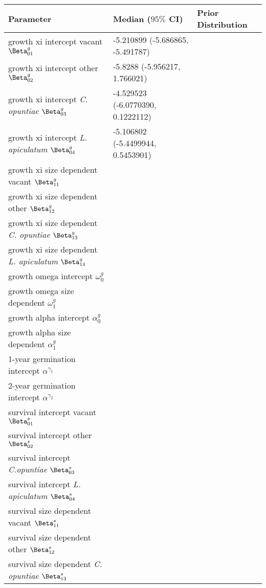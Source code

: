 \documentclass[11pt]{article}
\begin{document}
  \begin{table}[]
  \begin{tabular}{l|l|l}
    \textbf{Parameter} & \textbf{Median ($95\%$ CI)} & \textbf{Prior Distribution} \\
    \hline
    growth xi intercept vacant $\Beta_{01}^g$ & -5.210899 (-5.686865, -5.491787) & \\
    growth xi intercept other $\Beta_{02}^g$ & -5.8288 (-5.956217, 1.766021) & \\
    growth xi intercept \textit{C. opuntiae} $\Beta_{03}^g$ & -4.529523 (-6.0770390, 0.1222112) & \\
    growth xi intercept \textit{L. apiculatum} $\Beta_{04}^g$ & -5.106802 (-5.4499944, 0.5453901) & \\
    growth xi size dependent vacant $\Beta_{11}^g$ & & \\
    growth xi size dependent other $\Beta_{12}^g$ & & \\
    growth xi size dependent \textit{C. opuntiae} $\Beta_{13}^g$ & & \\
    growth xi size dependent \textit{L. apiculatum} $\Beta_{14}^g$ & & \\
    growth omega intercept $\omega_0^g$ & & \\
    growth omega size dependent $\omega_1^g$ & & \\
    growth alpha intercept $\alpha_0^g$ & & \\
    growth alpha size dependent $\alpha_1^g$ & & \\
    \hline
    1-year germination intercept $\alpha^{\gamma_1}$ & & \\
    2-year germination intercept $\alpha^{\gamma_2}$ & & \\
    \hline
    survival intercept vacant $\Beta_{01}^s$ & & \\
    survival intercept other $\Beta_{02}^s$ & & \\
    survival intercept \textit{C.opuntiae} $\Beta_{03}^s$ & & \\
    survival intercept \textit{L. apiculatum} $\Beta_{04}^s$ & & \\
    survival size dependent vacant $\Beta_{11}^s$ & & \\
    survival size dependent other $\Beta_{12}^s$ & & \\
    survival size dependent \textit{C. opuntiae} $\Beta_{13}^s$ & & \\

\end{tabular}
\end{table}
\end{document}
